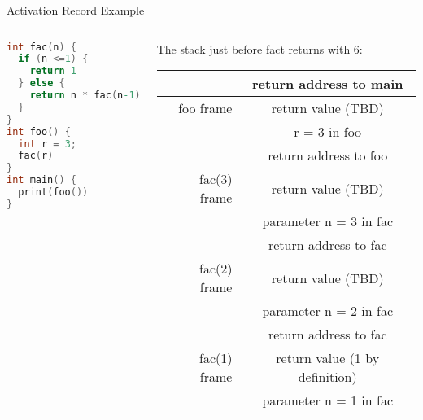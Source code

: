 \documentclass{beamer}
\begin{document}
\begin{frame}[fragile]{Activation Record Example}

\scriptsize
\begin{columns}
\begin{column}{3cm}
\begin{lstlisting}[language=C]
int fac(n) {
  if (n <=1) {
    return 1
  } else {
    return n * fac(n-1)
  }
}
int foo() {
  int r = 3;
  fac(r)
}
int main() {
  print(foo())
}
\end{lstlisting}
\end{column}

\begin{column}{6cm}
The stack just before fact returns with 6:
\begin{tabular}{r|c|}
 & return address to main \\ \hline
foo frame & return value (TBD) \\
 & r = 3 in foo \\
 & return address to foo \\ \hline
fac(3) frame & return value (TBD) \\
 & parameter n = 3 in fac \\
 & return address to fac \\ \hline
fac(2) frame & return value (TBD) \\
 & parameter n = 2 in fac \\
 & return address to fac \\ \hline
fac(1) frame & return value (1 by definition) \\
 & parameter n = 1 in fac \\ \hline
\end{tabular}

\end{column}
\end{columns}

\normalsize

\end{frame}
\end{document}
